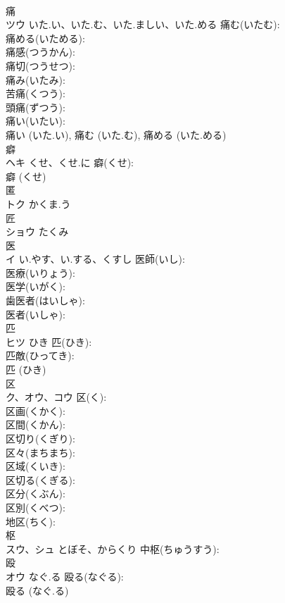 \documentclass[8pt]{extreport}
\begin{document}
\begin{CJK}{UTF8}{min}
\\	痛			
\\	ツウ	いた.い、いた.む、いた.ましい、いた.める	痛む(いたむ): 
\\	痛める(いためる): 
\\	痛感(つうかん): 
\\	痛切(つうせつ): 
\\	痛み(いたみ): 
\\	苦痛(くつう): 
\\	頭痛(ずつう): 
\\	痛い(いたい): 
\\	痛い (いた.い), 痛む (いた.む), 痛める (いた.める)
\\	癖			
\\	ヘキ	くせ、くせ.に	癖(くせ): 
\\	癖 (くせ)
\\	匿			
\\	トク	かくま.う		
\\	匠			
\\	ショウ	たくみ		
\\	医			
\\	イ	い.やす、い.する、くすし	医師(いし): 
\\	医療(いりょう): 
\\	医学(いがく): 
\\	歯医者(はいしゃ): 
\\	医者(いしゃ): 
\\	匹			
\\	ヒツ	ひき	匹(ひき): 
\\	匹敵(ひってき): 
\\	匹 (ひき)
\\	区			
\\	ク、オウ、コウ		区(く): 
\\	区画(くかく): 
\\	区間(くかん): 
\\	区切り(くぎり): 
\\	区々(まちまち): 
\\	区域(くいき): 
\\	区切る(くぎる): 
\\	区分(くぶん): 
\\	区別(くべつ): 
\\	地区(ちく): 
\\	枢			
\\	スウ、シュ	とぼそ、からくり	中枢(ちゅうすう): 
\\	殴			
\\	オウ	なぐ.る	殴る(なぐる): 
\\	殴る (なぐ.る)

\end{CJK}
\end{document}
